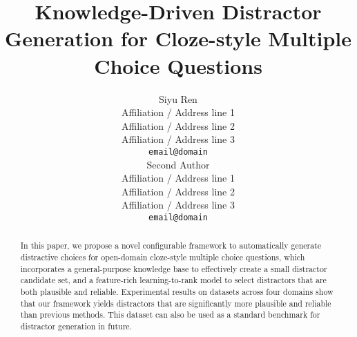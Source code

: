 \documentclass[11pt,a4paper]{article}
\newcommand{\KZ}[1]{\textcolor{blue}{Kenny: #1}}
\begin{document}
\title{Knowledge-Driven Distractor Generation for Cloze-style Multiple Choice Questions}

\author{Siyu Ren \\
  Affiliation / Address line 1 \\
  Affiliation / Address line 2 \\
  Affiliation / Address line 3 \\
  {\tt email@domain} \\\And
  Second Author \\
  Affiliation / Address line 1 \\
  Affiliation / Address line 2 \\
  Affiliation / Address line 3 \\
  {\tt email@domain} \\}

\maketitle

\begin{abstract}
In this paper, we propose a novel configurable framework to automatically generate distractive choices for open-domain cloze-style multiple choice questions, 
which incorporates a general-purpose knowledge base to 
effectively create a small distractor candidate set, and a feature-rich learning-to-rank model to select distractors that are both plausible and reliable. Experimental results on datasets across four domains show that our framework yields 
distractors that are significantly more plausible and reliable than
previous methods. This dataset can also be used as a standard benchmark for 
distractor generation in future.
\end{abstract}






% 


%


\end{document}
